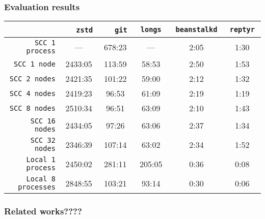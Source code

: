 \begin{frame}
\frametitle{Evaluation results}
\begin{table}[tbh]
\centering
\label{table:projects}
\begin{adjustbox}{width=110mm}
\begin{tabular}{|r|c|c|c|c|c|}
\hline
\           & $\quad$    \texttt{zstd}       $\quad$
            & $\quad$    \texttt{git}        $\quad$
            & $\quad$    \texttt{longs}      $\quad$
            & $\enspace$ \texttt{beanstalkd} $\enspace$
            & $\enspace$ \texttt{reptyr}     $\enspace$ \\ \hline

\texttt{SCC 1 process}
& ---     & 678:23   & ---    & 2:05 & 1:30 \\ \hline
\texttt{SCC 1 node}
& 2433:05 & 113:59   & 58:53  & 2:50 & 1:53 \\ \hline
\texttt{SCC 2 nodes}
& 2421:35 & 101:22   & 59:00  & 2:12 & 1:32 \\ \hline
\texttt{SCC 4 nodes}
& 2419:23 & 96:53    & 61:09  & 2:19 & 1:19 \\ \hline
\texttt{SCC 8 nodes}
& 2510:34 & 96:51    & 63:09  & 2:10 & 1:43 \\ \hline
\texttt{SCC 16 nodes}
& 2434:05 & 97:26    & 63:06  & 2:37 & 1:34 \\ \hline
\texttt{SCC 32 nodes}
& 2346:39 & 107:14   & 63:02  & 2:34 & 1:52 \\ \hline \hline
\texttt{Local 1 process}
& 2450:02 & 281:11   & 205:05 & 0:36 & 0:08 \\ \hline
\texttt{Local 8 processes}
& 2848:55 & 103:21   & 93:14  & 0:30 & 0:06 \\ \hline
\end{tabular}
\end{adjustbox}
\end{table}
\end{frame}


\begin{frame}
\frametitle{Related works????}
\end{frame}

